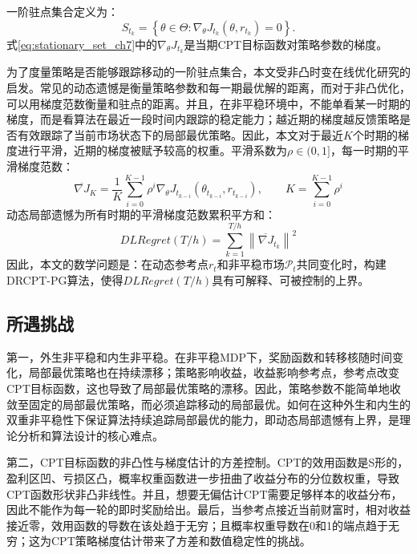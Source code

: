 \documentclass{sufethesismas}
\begin{document}
一阶驻点集合定义为：
\begin{equation}
\label{eq:stationary_set_ch7}
S_{t_k}
=
\left\{
\theta\in\Theta:
\nabla_\theta J_{t_k}(\theta,r_{t_k})=0
\right\}.
\end{equation}
式\eqref{eq:stationary_set_ch7}中的$\nabla_\theta J_{t_k}$是当期CPT目标函数对策略参数的梯度。

为了度量策略是否能够跟踪移动的一阶驻点集合，本文受非凸时变在线优化研究的启发\citep{hazan2017efficient,aydore2019dynamic}。常见的动态遗憾是衡量策略参数和每一期最优解的距离，而对于非凸优化，可以用梯度范数衡量和驻点的距离。并且，在非平稳环境中，不能单看某一时期的梯度，而是看算法在最近一段时间内跟踪的稳定能力；越近期的梯度越反馈策略是否有效跟踪了当前市场状态下的局部最优策略。因此，本文对于最近$K$个时期的梯度进行平滑，近期的梯度被赋予较高的权重。平滑系数为$\rho\in(0,1]$，每一时期的平滑梯度范数：
\begin{equation}
\label{eq:smoothed_gradient_ch7}
\overline{\nabla J}_K
=\frac{1}{K}
\sum_{i=0}^{K-1}
\rho^i
\nabla_\theta J_{t_{k-i}}(\theta_{t_{k-i}},r_{t_{k-i}}),
\qquad
K=
\sum_{i=0}^{K-1}\rho^i
\end{equation}
动态局部遗憾为所有时期的平滑梯度范数累积平方和：
\begin{equation}
\label{eq:dynamic_local_regret_ch7}
DLRegret(T/h)
=
\sum_{k=1}^{T/h}
\left\|
\overline{\nabla J}_{t_k}
\right\|^2
\end{equation}
因此，本文的数学问题是：在动态参考点$r_t$和非平稳市场$\mathcal{P}_t$共同变化时，构建DRCPT-PG算法，使得$DLRegret(T/h)$具有可解释、可被控制的上界。
\subsection{所遇挑战}

第一，外生非平稳和内生非平稳。在非平稳MDP下，奖励函数和转移核随时间变化，局部最优策略也在持续漂移；策略影响收益，收益影响参考点，参考点改变CPT目标函数，这也导致了局部最优策略的漂移。因此，策略参数不能简单地收敛至固定的局部最优策略，而必须追踪移动的局部最优。如何在这种外生和内生的双重非平稳性下保证算法持续追踪局部最优的能力，即动态局部遗憾有上界，是理论分析和算法设计的核心难点。

第二，CPT目标函数的非凸性与梯度估计的方差控制。CPT的效用函数是S形的，盈利区凹、亏损区凸，概率权重函数进一步扭曲了收益分布的分位数权重，导致CPT函数形状非凸非线性。并且，想要无偏估计CPT需要足够样本的收益分布，因此不能作为每一轮的即时奖励给出。最后，当参考点接近当前财富时，相对收益接近零，效用函数的导数在该处趋于无穷；且概率权重导数在0和1的端点趋于无穷；这为CPT策略梯度估计带来了方差和数值稳定性的挑战。
\end{document}
